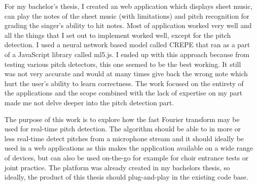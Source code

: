 For my bachelor's thesis, I created an web application which displays sheet music, can play the notes of the sheet music (with limitations) and pitch recognition for grading the singer's ability to hit notes. Most of application worked very well and all the things that I set out to implement worked well, except for the pitch detection. I used a neural network based model called CREPE that ran as a part of a JavaScript library called ml5.js. I ended up with this approach because from testing various pitch detectors, this one seemed to be the best working. It still was not very accurate and would at many times give back the wrong note which hurt the user's ability to learn correctness. The work focused on the entirety of the applications and the scope combined with the lack of expertise on my part made me not delve deeper into the pitch detection part.  

The purpose of this work is to explore how the fast Fourier transform may be used for real-time pitch detection. The algorithm should be able to in more or less real-time detect pitches from a microphone stream and it should ideally be used in a web applications as this makes the application available on a wide range of devices, but can also be used on-the-go for example for choir entrance tests or joint practice. The platform was already created in my bachelors thesis, so ideally, the product of this thesis should plug-and-play in the existing code base.



